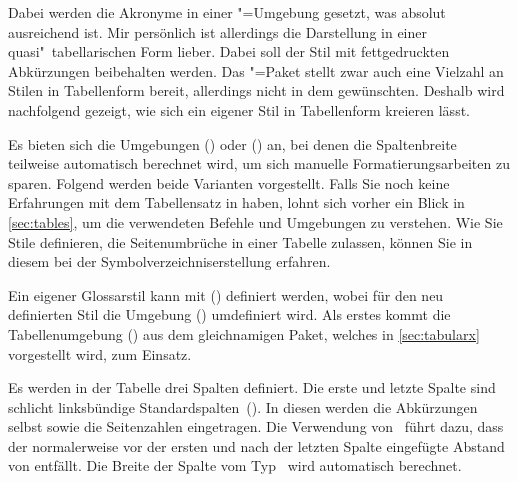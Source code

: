 \documentclass[%
  english,ngerman,%
  cdgeometry=no,DIV=12,automark%
]{tudscrartcl}
\begin{document}
\begin{quoting}[rightmargin=0pt]
\glsdisablehyper
\printacronyms[style=simple]
\end{quoting}
%
Dabei werden die Akronyme in einer "=Umgebung gesetzt,
was absolut ausreichend ist. Mir persönlich ist allerdings die Darstellung in 
einer quasi"~tabellarischen Form lieber. Dabei soll der Stil mit fettgedruckten 
Abkürzungen beibehalten werden. Das "=Paket stellt zwar 
auch eine Vielzahl an Stilen in Tabellenform bereit, allerdings nicht in dem 
gewünschten. Deshalb wird nachfolgend gezeigt, wie sich ein eigener Stil in 
Tabellenform kreieren lässt.

Es bieten sich die Umgebungen () oder 
() an, bei denen die Spaltenbreite teilweise 
automatisch berechnet wird, um sich manuelle Formatierungsarbeiten zu sparen. 
Folgend werden beide Varianten vorgestellt. Falls Sie noch keine Erfahrungen 
mit dem Tabellensatz in  haben, lohnt sich vorher ein Blick in 
\autoref{sec:tables}, um die verwendeten Befehle und Umgebungen zu verstehen. 
Wie Sie Stile definieren, die Seitenumbrüche in einer Tabelle zulassen, können 
Sie in diesem  bei der Symbolverzeichniserstellung 
erfahren.

Ein eigener Glossarstil kann mit () 
definiert werden, wobei für den neu definierten Stil die Umgebung 
() umdefiniert wird. Als erstes 
kommt die Tabellenumgebung () aus dem 
gleichnamigen Paket, welches in \autoref{sec:tabularx} vorgestellt wird, zum 
Einsatz.

Es werden in der Tabelle drei Spalten definiert. Die erste und letzte Spalte 
sind schlicht linksbündige Standardspalten~(). In diesen werden die 
Abkürzungen selbst sowie die Seitenzahlen eingetragen. Die Verwendung 
von~ führt dazu, dass der normalerweise vor der ersten 
und nach der letzten Spalte eingefügte Abstand von  entfällt. 
Die Breite der Spalte vom Typ~ wird automatisch berechnet.
\end{document}

